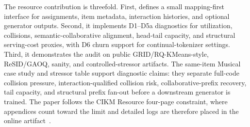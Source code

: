 The resource contribution is threefold. First, \tool defines a small
mapping-first interface for \sid assignments, item metadata, interaction
histories, and optional generator outputs. Second, it implements D1--D5a
diagnostics for utilization, collisions, semantic-collaborative alignment,
head-tail capacity, and structural serving-cost proxies, with D6 churn support
for continual-tokenizer settings. Third, it demonstrates the audit on public
GRID/RQ-KMeans-style, ReSID/GAOQ, sanity, and controlled-stressor artifacts.
The same-item Musical case study and stressor table support diagnostic claims:
they separate full-code collision pressure, interaction-qualified collision
risk, collaborative-prefix recovery, tail capacity, and structural prefix
fan-out before a downstream generator is trained. The paper follows the CIKM
Resource four-page constraint, where appendices count toward the limit and
detailed logs are therefore placed in the online artifact~\cite{cikm2026resource}.
